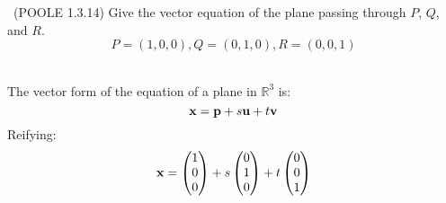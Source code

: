 \begin{problem}{\problemnum \, \textsf{(POOLE 1.3.14)}}
    Give the vector equation of the plane passing through $P$, $Q$, and $R$.
    \[
        P = (1, 0, 0),
        Q = (0, 1, 0),
        R = (0, 0, 1)
    \]
\end{problem}
\begin{solution}\\
    The vector form of the equation of a plane in $\mathbb{R}^3$ is:
    \[ \mathbf{x} = \mathbf{p} + s\mathbf{u} + t\mathbf{v} \]
    Reifying:
    \[ \mathbf{x} = \begin{pmatrix} 1 \\ 0 \\ 0\end{pmatrix} + s\begin{pmatrix} 0 \\ 1 \\ 0\end{pmatrix} + t\begin{pmatrix} 0 \\ 0 \\ 1\end{pmatrix}\]
\end{solution}
